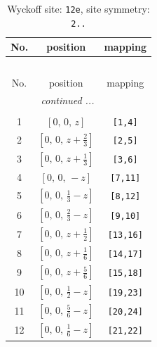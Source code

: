 \documentclass[fleqn,8pt]{jsarticle}
\begin{document}
\begin{longtable}{ccc}
\caption{Wyckoff site: {\tt 12e}, site symmetry: {\tt 2..}}
 \\
 \hline \hline
No. & position & mapping \\ \hline \endfirsthead

\multicolumn{2}{l}{\tablename\ \thetable{}} \\
 \hline \hline
No. & position & mapping \\ \hline \endhead

 \hline \hline
\multicolumn{2}{r}{\footnotesize\it continued ...} \\ \endfoot

 \hline \hline
\multicolumn{2}{r}{} \\ \endlastfoot

1 & $\left[ 0,\, 0,\, z \right]$ & {\tt [1,4]} \\ \hline
2 & $\left[ 0,\, 0,\, z + \frac{2}{3} \right]$ & {\tt [2,5]} \\ \hline
3 & $\left[ 0,\, 0,\, z + \frac{1}{3} \right]$ & {\tt [3,6]} \\ \hline
4 & $\left[ 0,\, 0,\, - z \right]$ & {\tt [7,11]} \\ \hline
5 & $\left[ 0,\, 0,\, \frac{1}{3} - z \right]$ & {\tt [8,12]} \\ \hline
6 & $\left[ 0,\, 0,\, \frac{2}{3} - z \right]$ & {\tt [9,10]} \\ \hline
7 & $\left[ 0,\, 0,\, z + \frac{1}{2} \right]$ & {\tt [13,16]} \\ \hline
8 & $\left[ 0,\, 0,\, z + \frac{1}{6} \right]$ & {\tt [14,17]} \\ \hline
9 & $\left[ 0,\, 0,\, z + \frac{5}{6} \right]$ & {\tt [15,18]} \\ \hline
10 & $\left[ 0,\, 0,\, \frac{1}{2} - z \right]$ & {\tt [19,23]} \\ \hline
11 & $\left[ 0,\, 0,\, \frac{5}{6} - z \right]$ & {\tt [20,24]} \\ \hline
12 & $\left[ 0,\, 0,\, \frac{1}{6} - z \right]$ & {\tt [21,22]} \\
\end{longtable}
\renewcommand{\arraystretch}{1.2}
\end{document}
